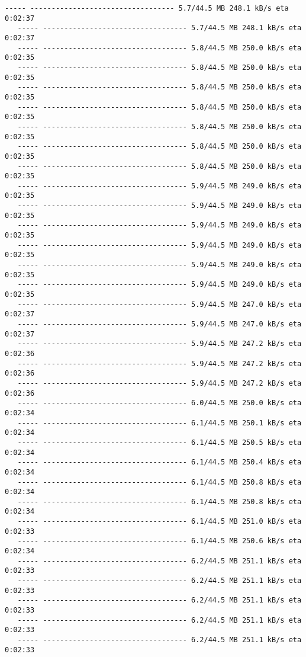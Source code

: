\documentclass[11pt]{article}
\begin{document}
\begin{Verbatim}[commandchars=\\\{\}]
   ----- ---------------------------------- 5.7/44.5 MB 248.1 kB/s eta 0:02:37
   ----- ---------------------------------- 5.7/44.5 MB 248.1 kB/s eta 0:02:37
   ----- ---------------------------------- 5.8/44.5 MB 250.0 kB/s eta 0:02:35
   ----- ---------------------------------- 5.8/44.5 MB 250.0 kB/s eta 0:02:35
   ----- ---------------------------------- 5.8/44.5 MB 250.0 kB/s eta 0:02:35
   ----- ---------------------------------- 5.8/44.5 MB 250.0 kB/s eta 0:02:35
   ----- ---------------------------------- 5.8/44.5 MB 250.0 kB/s eta 0:02:35
   ----- ---------------------------------- 5.8/44.5 MB 250.0 kB/s eta 0:02:35
   ----- ---------------------------------- 5.8/44.5 MB 250.0 kB/s eta 0:02:35
   ----- ---------------------------------- 5.9/44.5 MB 249.0 kB/s eta 0:02:35
   ----- ---------------------------------- 5.9/44.5 MB 249.0 kB/s eta 0:02:35
   ----- ---------------------------------- 5.9/44.5 MB 249.0 kB/s eta 0:02:35
   ----- ---------------------------------- 5.9/44.5 MB 249.0 kB/s eta 0:02:35
   ----- ---------------------------------- 5.9/44.5 MB 249.0 kB/s eta 0:02:35
   ----- ---------------------------------- 5.9/44.5 MB 249.0 kB/s eta 0:02:35
   ----- ---------------------------------- 5.9/44.5 MB 247.0 kB/s eta 0:02:37
   ----- ---------------------------------- 5.9/44.5 MB 247.0 kB/s eta 0:02:37
   ----- ---------------------------------- 5.9/44.5 MB 247.2 kB/s eta 0:02:36
   ----- ---------------------------------- 5.9/44.5 MB 247.2 kB/s eta 0:02:36
   ----- ---------------------------------- 5.9/44.5 MB 247.2 kB/s eta 0:02:36
   ----- ---------------------------------- 6.0/44.5 MB 250.0 kB/s eta 0:02:34
   ----- ---------------------------------- 6.1/44.5 MB 250.1 kB/s eta 0:02:34
   ----- ---------------------------------- 6.1/44.5 MB 250.5 kB/s eta 0:02:34
   ----- ---------------------------------- 6.1/44.5 MB 250.4 kB/s eta 0:02:34
   ----- ---------------------------------- 6.1/44.5 MB 250.8 kB/s eta 0:02:34
   ----- ---------------------------------- 6.1/44.5 MB 250.8 kB/s eta 0:02:34
   ----- ---------------------------------- 6.1/44.5 MB 251.0 kB/s eta 0:02:33
   ----- ---------------------------------- 6.1/44.5 MB 250.6 kB/s eta 0:02:34
   ----- ---------------------------------- 6.2/44.5 MB 251.1 kB/s eta 0:02:33
   ----- ---------------------------------- 6.2/44.5 MB 251.1 kB/s eta 0:02:33
   ----- ---------------------------------- 6.2/44.5 MB 251.1 kB/s eta 0:02:33
   ----- ---------------------------------- 6.2/44.5 MB 251.1 kB/s eta 0:02:33
   ----- ---------------------------------- 6.2/44.5 MB 251.1 kB/s eta 0:02:33

\end{Verbatim}
\end{document}
